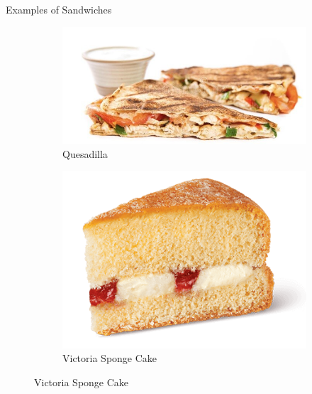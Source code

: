 \documentclass{beamer}
\begin{document}
\begin{frame}{Examples of Sandwiches}
    \begin{figure}
        \begin{subfigure}{.5\textwidth}
          \centering
          \includegraphics[width=\linewidth]{sandwich/19_quesadilla.jpg}
          \caption{\label{fig:quesadilla}Quesadilla}
        \end{subfigure}%
        \begin{subfigure}{.5\textwidth}
          \centering
          \includegraphics[width=.8\linewidth]{sandwich/19_victoria_sponge_cake.png}
          \caption{\label{fig:victoria-sponge}Victoria Sponge Cake}
        \end{subfigure}
    \end{figure}
\end{frame}
\end{document}
